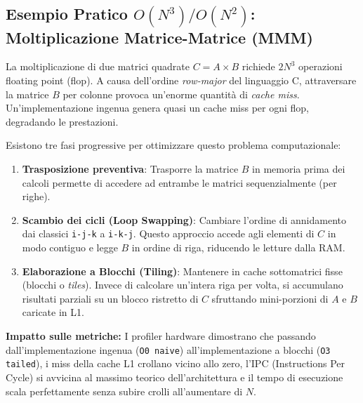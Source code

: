 \subsection{Esempio Pratico $O(N^3)/O(N^2)$: Moltiplicazione Matrice-Matrice (MMM)}
La moltiplicazione di due matrici quadrate $C = A \times B$ richiede $2N^3$ operazioni floating point (flop). A causa dell'ordine \textit{row-major} del linguaggio C, attraversare la matrice $B$ per colonne provoca un'enorme quantità di \textit{cache miss}. Un'implementazione ingenua genera quasi un cache miss per ogni flop, degradando le prestazioni.

Esistono tre fasi progressive per ottimizzare questo problema computazionale:
\begin{enumerate}
    \item \textbf{Trasposizione preventiva}: Trasporre la matrice $B$ in memoria prima dei calcoli permette di accedere ad entrambe le matrici sequenzialmente (per righe).
    \item \textbf{Scambio dei cicli (Loop Swapping)}: Cambiare l'ordine di annidamento dai classici \texttt{i-j-k} a \texttt{i-k-j}. Questo approccio accede agli elementi di $C$ in modo contiguo e legge $B$ in ordine di riga, riducendo le letture dalla RAM.
    \item \textbf{Elaborazione a Blocchi (Tiling)}: Mantenere in cache sottomatrici fisse (blocchi o \textit{tiles}). Invece di calcolare un'intera riga per volta, si accumulano risultati parziali su un blocco ristretto di $C$ sfruttando mini-porzioni di $A$ e $B$ caricate in L1. 
\end{enumerate}

\textbf{Impatto sulle metriche:} I profiler hardware dimostrano che passando dall'implementazione ingenua (\texttt{O0 naive}) all'implementazione a blocchi (\texttt{O3 tailed}), i miss della cache L1 crollano vicino allo zero, l'IPC (Instructions Per Cycle) si avvicina al massimo teorico dell'architettura e il tempo di esecuzione scala perfettamente senza subire crolli all'aumentare di $N$.
